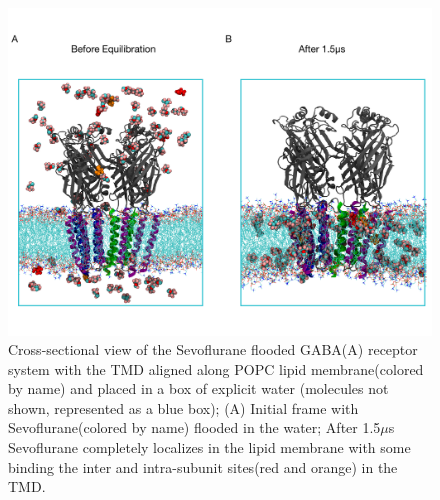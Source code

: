 \documentclass[12pt]{article}
\begin{document}
\begin{figure}
\begin{center}
\centering
\includegraphics[width = 1\textwidth]{finlpics/sev_floodcomp}
\caption{Cross-sectional view of the Sevoflurane flooded GABA(A) receptor system with the TMD aligned along POPC lipid membrane(colored by name) and placed in a box of explicit water (molecules not shown, represented as a blue box); (A) Initial frame with Sevoflurane(colored by name) flooded in the water; After  1.5$\mu$s  Sevoflurane completely localizes in the lipid membrane with some binding the inter and intra-subunit sites(red and orange) in the TMD.}
\label{fig:sevFlood}
\end{center}
\end{figure} 
\end{document}

